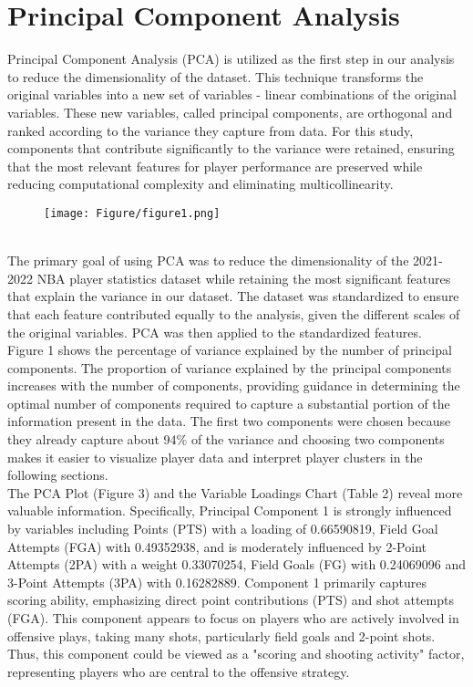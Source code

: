 \documentclass[fleqn,10pt]{SelfArx} %
\begin{document}
\section*{Principal Component Analysis}
Principal Component Analysis (PCA) is utilized as the first step in our analysis to reduce the dimensionality of the dataset. This technique transforms the original variables into a new set of variables -  linear combinations of the original variables. These new variables, called principal components, are orthogonal and ranked according to the variance they capture from data. For this study, components that contribute significantly to the variance were retained, ensuring that the most relevant features for player performance are preserved while reducing computational complexity and eliminating multicollinearity.
\begin{figure}[ht]
\centering
\centering
\texttt{[image: Figure/figure1.png]}
\end{figure}
\\The primary goal of using PCA was to reduce the dimensionality of the 2021-2022 NBA player statistics dataset while retaining the most significant features that explain the variance in our dataset. The dataset was standardized to ensure that each feature contributed equally to the analysis, given the different scales of the original variables. PCA was then applied to the standardized features.\\
Figure 1 shows the percentage of variance explained by the number of principal components. The proportion of variance explained by the principal components increases with the number of components, providing guidance in determining the optimal number of components required to capture a substantial portion of the information present in the data. The first two components were chosen because they already capture about 94\% of the variance and choosing two components makes it easier to visualize player data and interpret player clusters in the following sections.
\\
The PCA Plot (Figure 3) and the Variable Loadings Chart (Table 2) reveal more valuable information. Specifically, Principal Component 1 is strongly influenced by variables including Points (PTS) with a loading of 0.66590819, Field Goal Attempts (FGA) with 0.49352938, and is moderately influenced by 2-Point Attempts (2PA) with a weight 0.33070254, Field Goals (FG) with 0.24069096 and  3-Point Attempts (3PA) with 0.16282889. Component 1 primarily captures scoring ability, emphasizing direct point contributions (PTS) and shot attempts (FGA). This component appears to focus on players who are actively involved in offensive plays, taking many shots, particularly field goals and 2-point shots. Thus, this component could be viewed as a "scoring and shooting activity" factor, representing players who are central to the offensive strategy. \\
\end{document}
